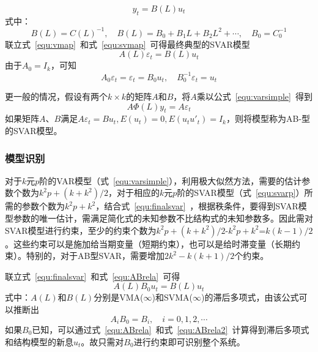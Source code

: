 \begin{equation}
	\label{equ:svmap}
	{{y}_{t}}=B(L){{u}_{t}}
\end{equation}
式中：
\begin{equation}
	B(L)=C{{(L)}^{-1}},\quad B(L)={{B}_{0}}+{{B}_{1}}L+{{B}_{2}}{{L}^{2}}+\cdots ,\quad {{B}_{0}}=C_{0}^{-1}
\end{equation}
联立式~\ref{equ:vmap}~和式~\ref{equ:svmap}~可得最终典型的SVAR模型
\begin{equation}
	\label{equ:finalsvar}
	A(L){\varepsilon }_{t}=B(L){u}_{t}
\end{equation}
由于$A_0=I_k$，可知
\begin{equation}
	\label{equ:ABrela}
	{A}_{0}{\varepsilon }_{t}={\varepsilon }_{t}={B_0}{u_t},\quad {B}_0^{-1}{\varepsilon }_{t}=u_t
\end{equation}

更一般的情况，假设有两个$k\times k$的矩阵$A$和$B$，将$A$乘以公式~\ref{equ:varsimple}~得到
\begin{equation}
	A{\Phi }(L)y_t=A{\varepsilon }_{t}
\end{equation}
如果矩阵$A$、$B$满足$A{\varepsilon }_{t}=Bu_t,E(u_t)=0,E(u_tu'_t)=I_k$，则将模型称为AB-型的SVAR模型。

\subsubsection{模型识别}

对于$k$元$p$阶的VAR模型（式~\ref{equ:varsimple}），利用极大似然方法，需要的估计参数个数为$k^2p+(k+k^2)/2$，对于相应的$k$元$p$阶的SVAR模型（式~\ref{equ:svarp}）所需的参数个数为$k^2p+k^2$，结合式~\ref{equ:finalsvar}~，根据秩条件，要得到SVAR模型参数的唯一估计，需满足简化式的未知参数不比结构式的未知参数多。因此需对SVAR模型进行约束，至少的约束个数为$k^2p+(k+k^2)/2$-$k^2p+k^2$=$k(k-1)/2$。这些约束可以是施加给当期变量（短期约束），也可以是给时滞变量（长期约束）。特别的，对于AB型SVAR，需要增加$2k^2-k(k+1)/2$个约束。

联立式~\ref{equ:finalsvar}~和式~\ref{equ:ABrela}~可得
\begin{equation}
	A(L)B_0u_t=B(L)u_t
\end{equation}
式中：$A(L)$和$B(L)$分别是VMA($\infty $)和SVMA($\infty $)的滞后多项式，由该公式可以推断出
\begin{equation}
	\label{equ:ABrela2}
	A_iB_0=B_i, \quad i=0,1,2,\cdots
\end{equation}
如果$B_0$已知，可以通过式~\ref{equ:ABrela}~和式~\ref{equ:ABrela2}~计算得到滞后多项式和结构模型的新息$u_t$。故只需对$B_0$进行约束即可识别整个系统。

